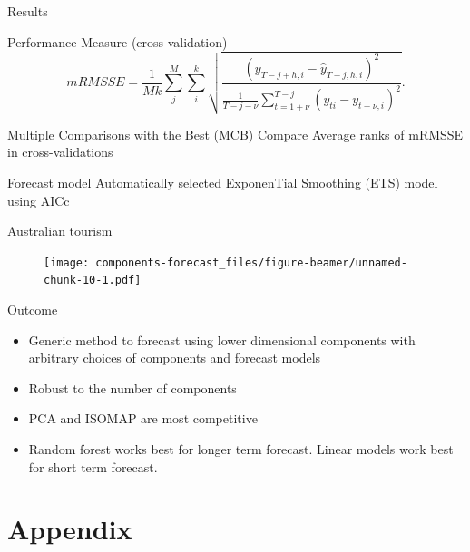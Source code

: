 \documentclass[14pt,ignorenonframetext,]{beamer}
\begin{document}
\begin{frame}{Results}
\protect\hypertarget{results}{}
\begin{block}{Performance Measure (cross-validation)}
\protect\hypertarget{performance-measure-cross-validation}{}
\[
mRMSSE = \frac{1}{Mk}\sum^{M}_j\sum^{k}_i
\sqrt{\frac
{(y_{T-j+h,i}-\hat{y}_{T-j, h,i})^2}
{\frac{1}{T-j-\nu}\sum^{T-j}_{t={1+\nu}}(y_{ti} - y_{t-\nu, i})^2}}.
\]
\end{block}

\begin{block}{Multiple Comparisons with the Best (MCB)}
\protect\hypertarget{multiple-comparisons-with-the-best-mcb}{}
Compare Average ranks of mRMSSE in cross-validations
\citep{Koning2005-ch}
\end{block}

\begin{block}{Forecast model}
\protect\hypertarget{forecast-model-1}{}
Automatically selected ExponenTial Smoothing (ETS) model using AICc
\end{block}
\end{frame}

\begin{frame}{Australian tourism}
\protect\hypertarget{australian-tourism}{}
\begin{figure}

{\centering \texttt{[image: components-forecast\_files/figure-beamer/unnamed-chunk-10-1.pdf]}

}

\end{figure}
\end{frame}

\begin{frame}{Outcome}
\protect\hypertarget{outcome}{}
\begin{itemize}
\item
  Generic method to forecast using lower dimensional components with
  arbitrary choices of components and forecast models
\item
  Robust to the number of components
\item
  PCA and ISOMAP are most competitive
\item
  Random forest works best for longer term forecast. Linear models work
  best for short term forecast.
\end{itemize}
\end{frame}

\hypertarget{appendix}{%
\section{Appendix}\label{appendix}}
\end{document}
